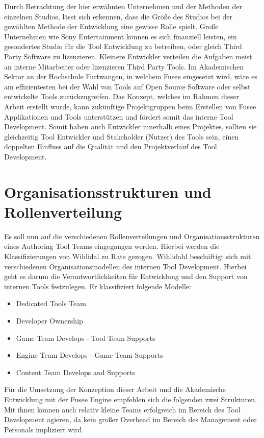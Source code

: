 \documentclass[pagesize, paper=a4, fontsize=12pt, titlepage=true, headings=small, headnosepline, abstractoff, liststotoc, nochapterprefix, plainheadsepline, twoside]{scrreprt}
\begin{document}
Durch Betrachtung der hier erwähnten Unternehmen und der Methoden der einzelnen Studios, lässt sich erkennen, dass die Größe des Studios bei der gewählten Methode der Entwicklung eine gewisse Rolle spielt. Große Unternehmen wie Sony Entertainment können es sich finanziell leisten, ein gesondertes Studio für die Tool Entwicklung zu betreiben, oder gleich Third Party Software zu lizenzieren. Kleinere Entwickler verteilen die Aufgaben meist an interne Mitarbeiter oder lizenzieren Third Party Tools. Im Akademischen Sektor an der Hochschule Furtwangen, in welchem Fusee eingesetzt wird, wäre es am effizientesten bei der Wahl von Tools auf Open Source Software oder selbst entwickelte Tools zurückzugreifen. Das Konzept, welches im Rahmen dieser Arbeit erstellt wurde, kann zukünftige Projektgruppen beim Erstellen von Fusee Applikationen und Tools unterstützen und fördert somit das interne Tool Development. Somit haben auch Entwickler innerhalb eines Projektes, sollten sie gleichzeitig Tool Entwickler und Stakeholder (Nutzer) des Tools sein, einen doppelten Einfluss auf die Qualität und den Projektverlauf des Tool Development.

\section{Organisationsstrukturen und Rollenverteilung}
Es soll nun auf die verschiedenen Rollenverteilungen und Organisationsstrukturen eines Authoring Tool Teams eingegangen werden. Hierbei werden die Klassifizierungen von Wihlidal zu Rate gezogen.
Wihlidahl \autocite[S. 5]{Wihlidal2006} beschäftigt sich mit verschiedenen Organisationsmodellen des internen Tool Development. Hierbei geht es darum die Verantwortlichkeiten für Entwicklung und den Support von internen Tools festzulegen. Er klassifiziert folgende Modelle:
\begin{itemize}
\item Dedicated Tools Team
\item Developer Ownership
\item Game Team Develops - Tool Team Supports
\item Engine Team Develops - Game Team Supports
\item Content Team Develops and Supports
\end{itemize}

Für die Umsetzung der Konzeption dieser Arbeit und die Akademische Entwicklung mit der Fusee Engine empfehlen sich die folgenden zwei Strukturen. Mit ihnen können auch relativ kleine Teams erfolgreich im Bereich des Tool Development agieren, da kein großer Overhead im Bereich des Management oder Personals impliziert wird.
\end{document}
